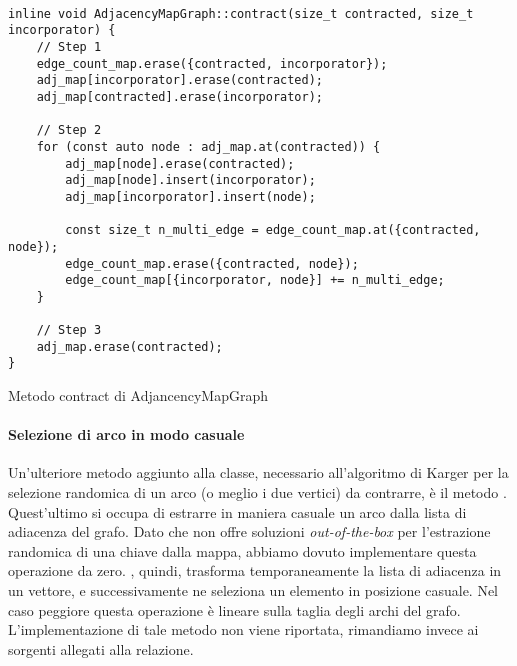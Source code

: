 \begin{listing}[!ht]
\begin{verbatim}

inline void AdjacencyMapGraph::contract(size_t contracted, size_t incorporator) {
    // Step 1
    edge_count_map.erase({contracted, incorporator});
    adj_map[incorporator].erase(contracted);
    adj_map[contracted].erase(incorporator);

    // Step 2
    for (const auto node : adj_map.at(contracted)) {
        adj_map[node].erase(contracted);
        adj_map[node].insert(incorporator);
        adj_map[incorporator].insert(node);

        const size_t n_multi_edge = edge_count_map.at({contracted, node});
        edge_count_map.erase({contracted, node});
        edge_count_map[{incorporator, node}] += n_multi_edge;
    }

    // Step 3
    adj_map.erase(contracted);
}
\end{verbatim}
\caption{Metodo contract di AdjancencyMapGraph}
\label{listing:met-contract}
\end{listing}

\paragraph{Selezione di arco in modo casuale}
Un'ulteriore metodo aggiunto alla classe, necessario all'algoritmo di
Karger per la selezione randomica di un arco (o meglio i due vertici)
da contrarre, è il metodo .
Quest'ultimo si occupa di estrarre in maniera casuale un arco dalla
lista di adiacenza del grafo. Dato che
 non offre soluzioni
\emph{out-of-the-box} per l'estrazione randomica di una chiave dalla
mappa, abbiamo dovuto implementare questa operazione da
zero. , quindi, trasforma
temporaneamente la lista di adiacenza in un vettore, e successivamente
ne seleziona un elemento in posizione casuale. Nel caso peggiore
questa operazione è lineare sulla taglia degli archi del
grafo. L'implementazione di tale metodo non viene riportata,
rimandiamo invece ai sorgenti allegati alla relazione.

